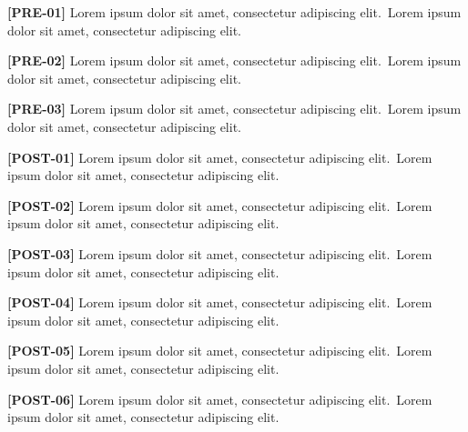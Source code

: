 \documentclass[twocolumn]{article}
\makeatletter
\let\fixture@hostoutputdblcol\@outputdblcol
\newcommand\Body{Lorem ipsum dolor sit amet, consectetur adipiscing elit.}
\newcommand\Par[1]{\par\textbf{[#1]} \Body\ \Body\par\medskip}
\newcommand\CheckOverlay{%
  \ifx\@outputdblcol\fixture@hostoutputdblcol
    \PackageError{fixture}{wideband-cc did not install its overlay on this host}{}%
  \fi}
\makeatother
\begin{document}
\CheckOverlay
\Par{PRE-01}\Par{PRE-02}\Par{PRE-03}
\begin{wideband}[rules=none]
  \centering{}
\end{wideband}
\Par{POST-01}\Par{POST-02}\Par{POST-03}\Par{POST-04}\Par{POST-05}\Par{POST-06}
\end{document}
